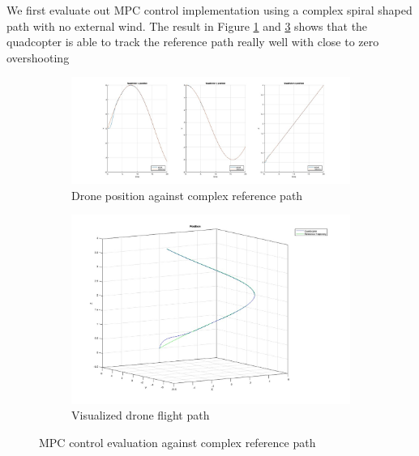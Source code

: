 \documentclass[12pt]{article}
\begin{document}


We first evaluate out MPC control implementation using a complex spiral shaped path with no external wind. The result in Figure \ref{fig:mpc_evaluation_complex_path} and \ref{fig:mpc_complex_path}
shows that the quadcopter is able to track the reference path really well with close to zero overshooting

\begin{figure}[H]
    \centering
    \begin{subfigure}{.6\linewidth}
        \centering
        \includegraphics[width=\linewidth]{figures/mpc_evaluation_complex_path}
        \caption{Drone position against complex reference path }
        \label{fig:mpc_evaluation_complex_path}
    \end{subfigure}
    \begin{subfigure}{.35\linewidth}
        \centering
        \includegraphics[width=\linewidth]{figures/mpc_complex_path}
        \caption{Visualized drone flight path}
        \label{fig:mpc_complex_path}
    \end{subfigure}
    \caption{MPC control evaluation against complex reference path}
\end{figure}
\end{document}

